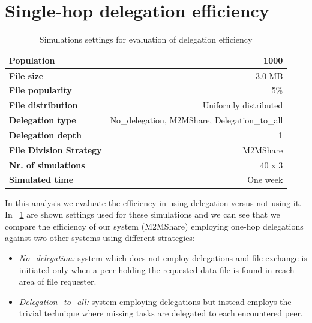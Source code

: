 \section{Single-hop delegation efficiency}
\label{analisiDelegationEfficiency}
\begin{table}[h]
\begin{center}
\begin{tabular}{|l|r|}
\hline
\bfseries Population & 1000 \\
\hline
\bfseries File size & 3.0 MB \\
\hline
\bfseries File popularity & 5\% \\
\hline
\bfseries File distribution & Uniformly distributed \\
\hline
\bfseries Delegation type & No\_delegation, M2MShare, Delegation\_to\_all \\
\hline
\bfseries Delegation depth & 1 \\
\hline
\bfseries File Division Strategy & M2MShare \\
\hline
\bfseries Nr. of simulations & 40 x 3\\
\hline
\bfseries Simulated time & One week \\
\hline
\end{tabular}
\end{center}
\caption{Simulations settings for evaluation of delegation efficiency\label{tab:settingsIniziali}}
\end{table}
In this analysis we evaluate the efficiency in using delegation versus not using it. In \tablename~\ref{tab:settingsIniziali} are shown settings used for these simulations and we can see that we compare the efficiency of our system (M2MShare) employing one-hop delegations against two other systems using different strategies:
\begin{itemize}
\item \textit{No\_delegation:} system which does not employ delegations and file exchange is initiated only when a peer holding the requested data file is found in reach area of file requester.
\item \textit{Delegation\_to\_all:} system employing delegations but instead employs the trivial technique where missing tasks are delegated to each encountered peer.
\end{itemize}

